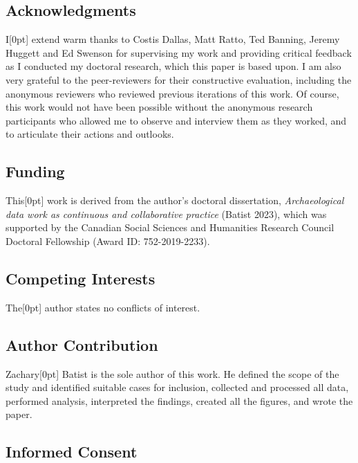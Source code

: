 \documentclass[
]{article}
\newcommand{\paragraphnumber}[1]{\marginnote{\color{lightgray}\tiny{#1}}[0pt]}
\begin{document}
\subsection{Acknowledgments}\label{acknowledgments}

I\paragraphnumber{[125]} extend warm thanks to Costis Dallas, Matt
Ratto, Ted Banning, Jeremy Huggett and Ed Swenson for supervising my
work and providing critical feedback as I conducted my doctoral
research, which this paper is based upon. I am also very grateful to the
peer-reviewers for their constructive evaluation, including the
anonymous reviewers who reviewed previous iterations of this work. Of
course, this work would not have been possible without the anonymous
research participants who allowed me to observe and interview them as
they worked, and to articulate their actions and outlooks.

\subsection{Funding}\label{funding}

This\paragraphnumber{[126]} work is derived from the author's doctoral
dissertation, \emph{Archaeological data work as continuous and
collaborative practice} (Batist 2023), which was supported by the
Canadian Social Sciences and Humanities Research Council Doctoral
Fellowship (Award ID: 752-2019-2233).

\subsection{Competing Interests}\label{competing-interests}

The\paragraphnumber{[127]} author states no conflicts of interest.

\subsection{Author Contribution}\label{author-contribution}

Zachary\paragraphnumber{[128]} Batist is the sole author of this work.
He defined the scope of the study and identified suitable cases for
inclusion, collected and processed all data, performed analysis,
interpreted the findings, created all the figures, and wrote the paper.

\subsection{Informed Consent}\label{informed-consent}
\end{document}
